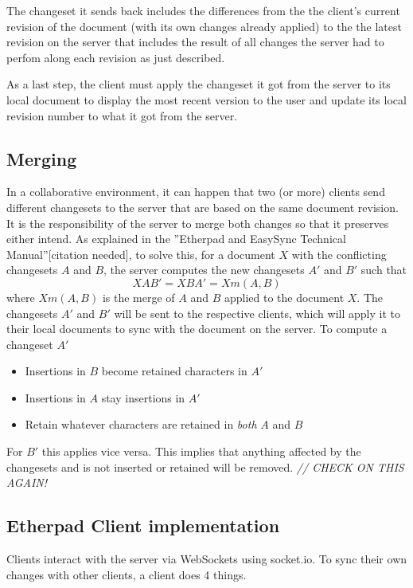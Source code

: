 The changeset it sends back includes the differences from the the client's current revision of the document (with its own changes already applied) to the the latest revision on the server that includes the result of all changes the server had to perfom along each revision as just described.

As a last step, the client must apply the changeset it got from the server to its local document to display the most recent version to the user and update its local revision number to what it got from the server.

\subsection{Merging}

In a collaborative environment, it can happen that two (or more) clients send different changesets to the server that are based on the same document revision. It is the responsibility of the server to merge both changes so that it preserves either intend. As explained in the ''Etherpad and EasySync Technical Manual''[citation needed], to solve this, for a document $X$ with the conflicting changesets $A$ and $B$, the server computes the new changesets $A'$ and $B'$ such that
$$XAB' = XBA' = Xm(A,B)$$
where $Xm(A,B)$ is the merge of $A$ and $B$ applied to the document $X$. The changesets $A'$ and $B'$ will be sent to the respective clients, which will apply it to their local documents to sync with the document on the server. To compute a changeset $A'$

\begin{itemize}
\item Insertions in $B$ become retained characters in $A'$
\item Insertions in $A$ stay insertions in $A'$
\item Retain whatever characters are retained in \emph{both} $A$ and $B$
\end{itemize}

For $B'$ this applies vice versa. This implies that anything affected by the changesets and is not inserted or retained will be removed. \textit{// CHECK ON THIS AGAIN!}

\subsection{Etherpad Client implementation}

Clients interact with the server via WebSockets using socket.io. To sync their own changes with other clients, a client does 4 things.


